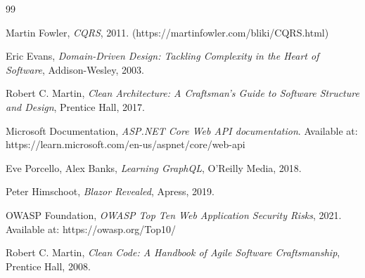 
\pagebreak


\begin{thebibliography}{99}

Martin Fowler, \textit{CQRS}, 2011. (https://martinfowler.com/bliki/CQRS.html)

Eric Evans, \textit{Domain-Driven Design: Tackling Complexity in the Heart of Software}, Addison-Wesley, 2003.

Robert C. Martin, \textit{Clean Architecture: A Craftsman's Guide to Software Structure and Design}, Prentice Hall, 2017.

Microsoft Documentation, \textit{ASP.NET Core Web API documentation}.
Available at: https://learn.microsoft.com/en-us/aspnet/core/web-api

Eve Porcello, Alex Banks, \textit{Learning GraphQL}, O'Reilly Media, 2018.

Peter Himschoot, \textit{Blazor Revealed}, Apress, 2019.

OWASP Foundation, \textit{OWASP Top Ten Web Application Security Risks}, 2021.
Available at: https://owasp.org/Top10/

Robert C. Martin, \textit{Clean Code: A Handbook of Agile Software Craftsmanship}, Prentice Hall, 2008.

\end{thebibliography}